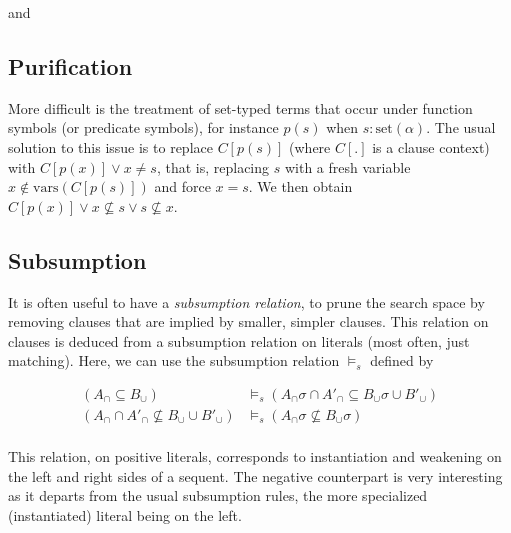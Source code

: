 \documentclass{article}
\newcommand{\set}[1]{\ensuremath{\text{set}({#1})}}
\begin{document}
and

\begin{prooftree}
\end{prooftree}

\subsection{Purification}
More difficult is the treatment of set-typed terms that occur under function
symbols (or predicate symbols), for instance $p(s)$ when $s:\set{\alpha}$.
The usual solution to this issue is
to replace $C[p(s)]$ (where $C[.]$ is a clause context) with
$C[p(x)] \lor x \not= s$, that is, replacing $s$ with a fresh variable
$x\not\in \text{vars}(C[p(s)])$ and force $x=s$. We then obtain
$C[p(x)] \lor x\not\subseteq s \lor s\not\subseteq x$.

\subsection{Subsumption}
It is often useful to have a \emph{subsumption relation}, to prune the search
space by removing clauses that are implied by smaller, simpler clauses. This
relation on clauses is deduced from a subsumption relation on literals (most
often, just matching). Here, we can use the subsumption relation $\models_s$ defined
by

\begin{align*}
(A_\cap \subseteq B_\cup) &\models_s
    (A_\cap\sigma \cap A'_\cap \subseteq B_\cup\sigma \cup B'_\cup) \\
(A_\cap \cap A'_\cap \not\subseteq B_\cup \cup B'_\cup) &\models_s
    (A_\cap\sigma\not\subseteq B_\cup\sigma) \\
\end{align*}

This relation, on positive literals, corresponds to instantiation and
weakening on the left and right sides of a sequent. The negative counterpart
is very interesting as it departs from the usual subsumption rules, the
more specialized (instantiated) literal being on the left.

\end{document}
